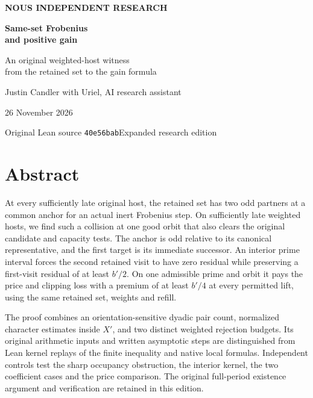 \documentclass[12pt,letterpaper]{article}
\begin{document}
\thispagestyle{empty}
\begin{center}
\vspace*{.50in}
{\sffamily\small\bfseries\color{accent}NOUS INDEPENDENT RESEARCH}\par\vspace{.62in}
{\fontsize{31}{37}\selectfont\bfseries\color{ink}Same-set Frobenius\\and positive gain}\par\vspace{.25in}
{\Large An original weighted-host witness\\from the retained set to the gain formula}\par\vspace{.34in}
\par\vspace{.46in}
{\large Justin Candler with Uriel, AI research assistant}\par
26 November 2026
\end{center}
\vfill
\begin{center}\small\sffamily
Original Lean source \texttt{40e56bab}\quad\textbar\quad Expanded research edition
\end{center}
\clearpage
\section*{Abstract}
At every sufficiently late original host, the retained set has two odd partners at a common anchor for an actual inert Frobenius step. On sufficiently late weighted hosts, we find such a collision at one good orbit that also clears the original candidate and capacity tests. The anchor is odd relative to its canonical representative, and the first target is its immediate successor. An interior prime interval forces the second retained visit to have zero residual while preserving a first-visit residual of at least \(b'/2\). On one admissible prime and orbit it pays the price and clipping loss with a premium of at least \(b'/4\) at every permitted lift, using the same retained set, weights and refill.

The proof combines an orientation-sensitive dyadic pair count, normalized character estimates inside \(X'\), and two distinct weighted rejection budgets. Its original arithmetic inputs and written asymptotic steps are distinguished from Lean kernel replays of the finite inequality and native local formulas. Independent controls test the sharp occupancy obstruction, the interior kernel, the two coefficient cases and the price comparison. The original full-period existence argument and verification are retained in this edition.
\end{document}
